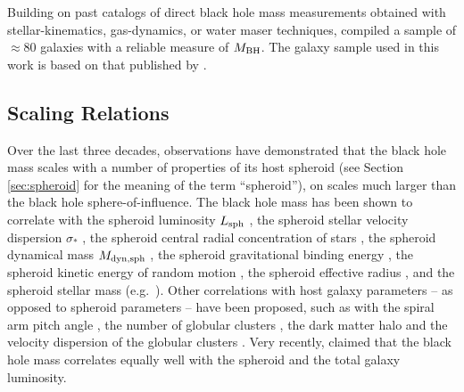 Building on past catalogs of direct black hole mass measurements 
obtained with stellar-kinematics, gas-dynamics, or water maser techniques, 
\cite{grahamscott2013} compiled a sample of $\approx 80$ galaxies with a reliable measure of $M_{\rm BH}$. 
The galaxy sample used in this work is based on that published by \cite{grahamscott2013}.



\subsection{Scaling Relations}
Over the last three decades, observations have demonstrated that 
the black hole mass scales with a number of properties of its host spheroid 
(see Section \ref{sec:spheroid} for the meaning of the term ``spheroid''), 
on scales much larger than the black hole sphere-of-influence.
The black hole mass has been shown to correlate with 
the spheroid luminosity $L_{\rm sph}$ \citep{dressler1989,kormendyrichstone1995}, 
the spheroid stellar velocity dispersion $\sigma_*$ \citep{ferraresemerritt2000,gebhardt2000}, 
the spheroid central radial concentration of stars \citep{graham2001,grahamdriver2007}, 
the spheroid dynamical mass $M_{\rm dyn,sph}$ \citep{magorrian1998,marconihunt2003,haringrix2004}, 
the spheroid gravitational binding energy \citep{allerrichstone2007}, 
the spheroid kinetic energy of random motion \citep{feolimele2005,feolimancini2009},
the spheroid effective radius \citep{sani2011}, 
and the spheroid stellar mass (e.g.~\citealt{magorrian1998,sani2011,beifiori2012,scott2013}).
Other correlations with host galaxy parameters  -- as opposed to spheroid parameters -- have been proposed, such as with
the spiral arm pitch angle \citep{seigar2008,berrier2013}, 
the number of globular clusters \citep{burkerttremaine2010,snyder2011},
the dark matter halo \citep{ferrarese2002}
and the velocity dispersion of the globular clusters \citep{sadouncolin2012,pota2013}. 
Very recently, \cite{lasker2014anal} claimed that the black hole mass correlates equally well with the spheroid and 
the total galaxy luminosity. \\


